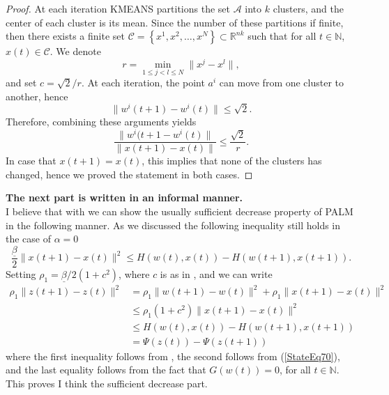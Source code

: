 \documentclass[11pt]{article}
\numberwithin{equation}{section}
\begin{document}
\begin{proof}
At each iteration KMEANS partitions the set $\mathcal{A}$ into $k$ clusters, and the center of each cluster is its mean. Since the number of these partitions if finite, then there exists a finite set $\mathcal{C} = \left\lbrace x^1,x^2, \ldots, x^N \right\rbrace \subset \mathbb{R}^{nk}$ such that for all $t \in \mathbb{N}$, $x(t) \in \mathcal{C}$. We denote
\begin{equation*}
	r = \min\limits_{1 \leq j < l \leq N} \|x^j-x^l\|,
\end{equation*}
and set $c = \sqrt{2}/r$.
At each iteration, the point $a^i$ can move from one cluster to another, hence
\begin{equation*}
	\|w^i(t+1)-w^i(t)\| \leq \sqrt{2} .
\end{equation*}
Therefore, combining these arguments yields
\begin{equation*}
	\frac{\|w^i(t+1-w^i(t)\|}{\|x(t+1)-x(t)\|} \leq \frac{\sqrt{2}}{r} .
\end{equation*}
In case that $x(t+1)=x(t)$, this implies that none of the clusters has changed, hence we proved the statement in both cases.
\end{proof}
\textbf{The next part is written in an informal manner.} \\
I believe that with  we can show the usually sufficient decrease property of PALM in the following manner. As we discussed the following inequality still holds in the case of $\alpha = 0$
\begin{equation}
	\frac{\underline{\beta}}{2} \|x(t+1)-x(t)\|^2 \leq H(w(t),x(t)) - H(w(t+1),x(t+1)) . \label{StateEq70}
\end{equation}
Setting $\rho_1 = \underline{\beta} /2(1 + c^2)$, where $c$ is as in , and we can write
\begin{equation*}
\begin{aligned}
	\rho_1 \|z(t+1)-z(t)\|^2 &= \rho_1 \|w(t+1)-w(t)\|^2 + \rho_1 \|x(t+1)-x(t)\|^2 \\
	&\leq \rho_1 (1 + c^2) \|x(t+1) - x(t)\|^2 \\
	&\leq H(w(t),x(t)) - H(w(t+1),x(t+1)) \\
	&= \Psi(z(t)) - \Psi(z(t+1))
\end{aligned}
\end{equation*}
where the first inequality follows from , the second follows from (\ref{StateEq70}), and the last equality follows from the fact that $G(w(t))=0$, for all $t \in \mathbb{N}$. This proves I think the sufficient decrease part.
\end{document}
